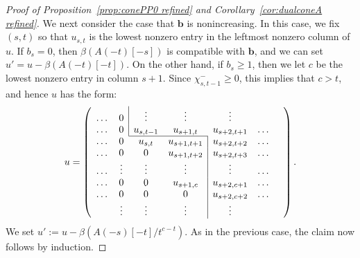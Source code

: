 \documentclass[12pt]{amsart}
\theoremstyle{definition}
\theoremstyle{remark}
\newcommand{\bb}{\mathbf{b}}
\begin{document}
\begin{proof}[Proof of Proposition~\ref{prop:conePP0 refined} and Corollary~\ref{cor:dualconeA refined}]
We next consider the case that $\bb$ is nonincreasing.  In this case,  we fix $(s,t)$ so that $u_{s,t}$ is the lowest nonzero entry in the leftmost nonzero column of $u$.  If $b_s=0$, then $\beta(A(-t)[-s])$ is compatible with $\bb$, and we can set $u'=u-\beta(A(-t)[-t])$.  On the other hand, if $b_s\geq 1$, then we let $c$ be the lowest nonzero entry in column $s+1$.  Since $\chi^{-}_{s,t-1}\geq 0$, this implies that $c>t$, and hence $u$ has the form:
\[
u=
\left(
\begin{array}{ccccccc}
\dots&0&\multicolumn{1}{|c}{\vdots}&\vdots&\vdots&\\
\dots&0&\multicolumn{1}{|c}{u_{s,t-1}}&u_{s+1,t}&u_{s+2,t+1}&\dots\\ \cline{3-4}
\dots&0&{u_{s,t}}&u_{s+1,t+1}&\multicolumn{1}{|c}{u_{s+2,t+2}}&\dots\\ 
\dots&0&0&u_{s+1,t+2}&\multicolumn{1}{|c}{u_{s+2,t+3}}&\dots\\
\dots&\vdots &\vdots &\vdots &\multicolumn{1}{|c}{\vdots}&\dots\\
\dots&0&0&u_{s+1,c}&\multicolumn{1}{|c}{u_{s+2,c+1}}&\dots\\
\dots&0&0&0&\multicolumn{1}{|c}{u_{s+2,c+2}}&\dots\\
&\vdots& \vdots&\vdots&\multicolumn{1}{|c}{\vdots}&&\\
\end{array}\right).
\]
We set $u':=u-\beta(A(-s)[-t]/t^{c-t})$.  As in the previous case, the claim now follows by induction.
\end{proof}
\end{document}
